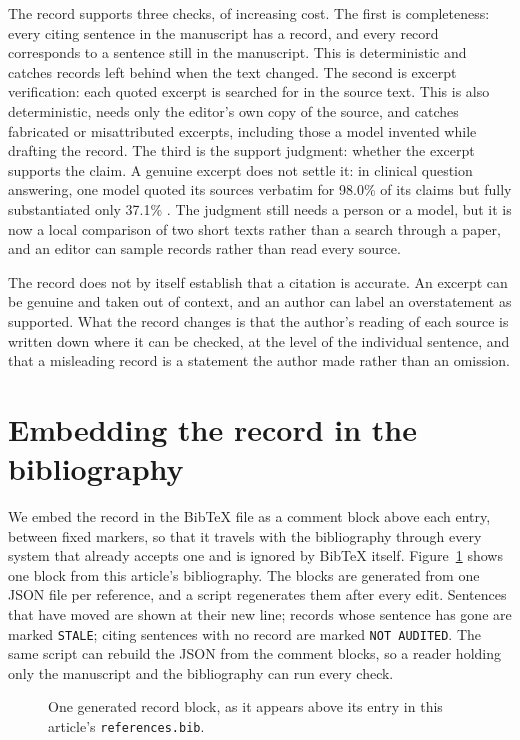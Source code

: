 \documentclass[11pt]{article}
\begin{document}
The record supports three checks, of increasing cost. The first is completeness: every citing sentence in the manuscript has a record, and every record corresponds to a sentence still in the manuscript. This is deterministic and catches records left behind when the text changed. The second is excerpt verification: each quoted excerpt is searched for in the source text. This is also deterministic, needs only the editor's own copy of the source, and catches fabricated or misattributed excerpts, including those a model invented while drafting the record. The third is the support judgment: whether the excerpt supports the claim. A genuine excerpt does not settle it: in clinical question answering, one model quoted its sources verbatim for 98.0\% of its claims but fully substantiated only 37.1\% \citep{zhang2026verifiable}. The judgment still needs a person or a model, but it is now a local comparison of two short texts rather than a search through a paper, and an editor can sample records rather than read every source.

The record does not by itself establish that a citation is accurate. An excerpt can be genuine and taken out of context, and an author can label an overstatement as supported. What the record changes is that the author's reading of each source is written down where it can be checked, at the level of the individual sentence, and that a misleading record is a statement the author made rather than an omission.

\section{Embedding the record in the bibliography}

We embed the record in the BibTeX file as a comment block above each entry, between fixed markers, so that it travels with the bibliography through every system that already accepts one and is ignored by BibTeX itself. Figure~\ref{fig:example} shows one block from this article's bibliography. The blocks are generated from one JSON file per reference, and a script regenerates them after every edit. Sentences that have moved are shown at their new line; records whose sentence has gone are marked \texttt{STALE}; citing sentences with no record are marked \texttt{NOT AUDITED}. The same script can rebuild the JSON from the comment blocks, so a reader holding only the manuscript and the bibliography can run every check.

\begin{figure}[t]
\centering
{}
\caption{One generated record block, as it appears above its entry in this article's \texttt{references.bib}.}
\label{fig:example}
\end{figure}
\end{document}
